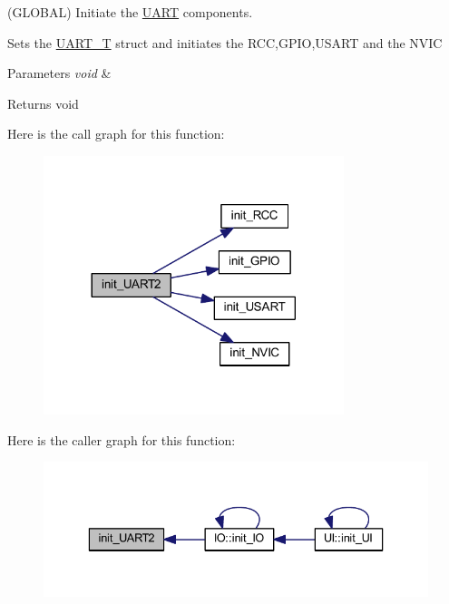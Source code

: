 (G\+L\+O\+B\+AL) Initiate the \mbox{\hyperlink{namespace_u_a_r_t}{U\+A\+RT}} components. 

Sets the \mbox{\hyperlink{struct_u_a_r_t_1_1_u_a_r_t___t}{U\+A\+R\+T\+\_\+T}} struct and initiates the R\+CC,G\+P\+IO,U\+S\+A\+RT and the N\+V\+IC


\begin{DoxyParams}{Parameters}
{\em void} & \\
\hline
\end{DoxyParams}
\begin{DoxyReturn}{Returns}
void 
\end{DoxyReturn}
Here is the call graph for this function\+:\nopagebreak
\begin{figure}[H]
\begin{center}
\leavevmode
\includegraphics[width=248pt]{namespace_u_a_r_t_ab8b1cbca4aa5321487c7f78df50efdc6_cgraph}
\end{center}
\end{figure}
Here is the caller graph for this function\+:\nopagebreak
\begin{figure}[H]
\begin{center}
\leavevmode
\includegraphics[width=336pt]{namespace_u_a_r_t_ab8b1cbca4aa5321487c7f78df50efdc6_icgraph}
\end{center}
\end{figure}
\mbox{\label{namespace_u_a_r_t_aaa88a606dc9d9361e67a256ed1f21a83}} 
